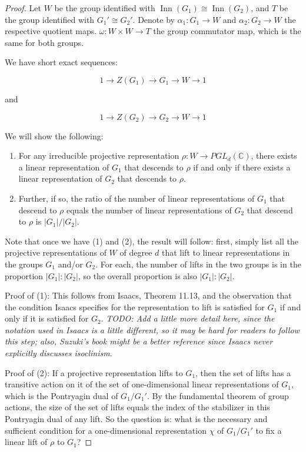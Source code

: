 \documentclass{ucetd}
\begin{document}
\begin{proof}
  Let $W$ be the group identified with $\operatorname{Inn}(G_1) \cong
  \operatorname{Inn}(G_2)$, and $T$ be the group identified with $G_1'
  \cong G_2'$. Denote by $\alpha_1:G_1 \to W$ and $\alpha_2: G_2 \to
  W$ the respective quotient maps. $\omega: W \times W \to T$ the group
  commutator map, which is the same for both groups.

  We have short exact sequences:

  $$1 \to Z(G_1) \to G_1 \to W \to 1$$

  and

  $$1 \to Z(G_2) \to G_2 \to W \to 1$$

  We will show the following:

  \begin{enumerate}
  \item For any irreducible projective representation $\rho: W \to
    PGL_d(\mathbb{C})$, there exists a linear representation of $G_1$
    that descends to $\rho$ if and only if there exists a linear
    representation of $G_2$ that descends to $\rho$.
  \item Further, if so, the ratio of the number of linear
    representations of $G_1$ that descend to $\rho$ equals the number
    of linear representations of $G_2$ that descend to $\rho$ is
    $|G_1|/|G_2|$.
  \end{enumerate}

  Note that once we have (1) and (2), the result will follow: first,
  simply list all the projective representations of $W$ of degree $d$
  that lift to linear representations in the groups $G_1$ and/or
  $G_2$. For each, the number of lifts in the two groups is in the
  proportion $|G_1|:|G_2|$, so the overall proportion is also
  $|G_1|:|G_2|$.

  Proof of (1): This follows from Isaacs, Theorem 11.13, and the
  observation that the condition Isaacs specifies for the
  representation to lift is satisfied for $G_1$ if and only if it is
  satisfied for $G_2$. {\em TODO: Add a little more detail here, since
  the notation used in Isaacs is a little different, so it may be hard
  for readers to follow this step; also, Suzuki's book might be a
  better reference since Isaacs never explicitly discusses isoclinism}.

  Proof of (2): If a projective representation lifts to $G_1$, then
  the set of lifts has a transitive action on it of the set of
  one-dimensional linear representations of $G_1$, which is the
  Pontryagin dual of $G_1/G_1'$. By the fundamental theorem of group
  actions, the size of the set of lifts equals the index of the
  stabilizer in this Pontryagin dual of any lift. So the question is:
  what is the necessary and sufficient condition for a one-dimensional
  representation $\chi$ of $G_1/G_1'$ to fix a linear lift of $\rho$
  to $G_1$?


\end{proof}
\end{document}
